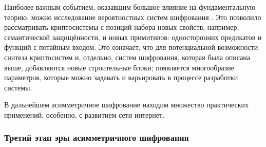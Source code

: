      \color{Cerulean}Наиболее важным событием, оказавшим большое влияние на фундаментальную теорию, можно исследование вероятностных систем шифрования \cite{ProbEnc-82}. Это позволило рассматривать криптосистемы с позиций набора новых  свойств, например, семантической защищённости, и новых примитивов: односторонних предикатов и функций с потайным входом. Это означает, что для потенциальной возможности синтеза криптосистем и, отдельно, систем шифрования, которая была описана выше, добавляются новые строительные блоки; появляется многообразие параметров, которые можно задавать и варьировать в процессе разработки системы.\par
     \color{Plum}В дальнейшем асимметричное шифрование находим множество практических применений, особенно, с развитием сети интернет.\par

    \subsubsection{Третий этап эры асимметричного шифрования}

